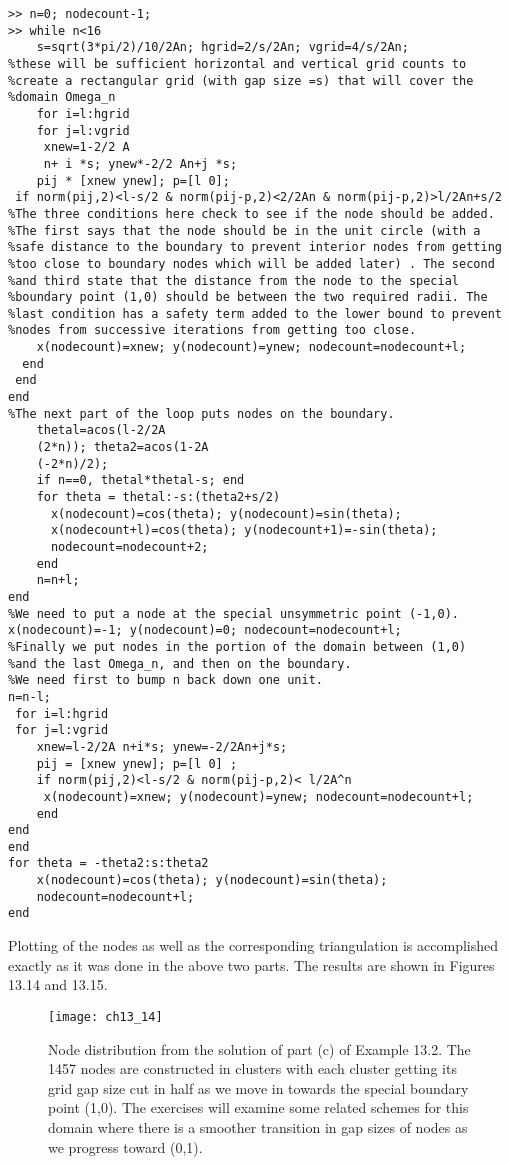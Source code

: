 \documentclass[../main.tex]{subfiles}
\begin{document}
\begin{lstlisting}[numbers=none,frame=none]
>> n=0; nodecount-1; 
>> while n<16 
	s=sqrt(3*pi/2)/10/2An; hgrid=2/s/2An; vgrid=4/s/2An; 
%these will be sufficient horizontal and vertical grid counts to 
%create a rectangular grid (with gap size =s) that will cover the 
%domain Omega_n 
	for i=l:hgrid 
	for j=l:vgrid 
	 xnew=1-2/2 A
	 n+ i *s; ynew*-2/2 An+j *s; 
	pij * [xnew ynew]; p=[l 0]; 
 if norm(pij,2)<l-s/2 & norm(pij-p,2)<2/2An & norm(pij-p,2)>l/2An+s/2 
%The three conditions here check to see if the node should be added. 
%The first says that the node should be in the unit circle (with a 
%safe distance to the boundary to prevent interior nodes from getting 
%too close to boundary nodes which will be added later) . The second
%and third state that the distance from the node to the special 
%boundary point (1,0) should be between the two required radii. The 
%last condition has a safety term added to the lower bound to prevent 
%nodes from successive iterations from getting too close. 
	x(nodecount)=xnew; y(nodecount)=ynew; nodecount=nodecount+l; 
  end 
 end 
end 
%The next part of the loop puts nodes on the boundary. 
	thetal=acos(l-2/2A
	(2*n)); theta2=acos(1-2A
	(-2*n)/2); 
	if n==0, thetal*thetal-s; end 
	for theta = thetal:-s:(theta2+s/2) 
  	  x(nodecount)=cos(theta); y(nodecount)=sin(theta); 
	  x(nodecount+l)=cos(theta); y(nodecount+1)=-sin(theta); 
	  nodecount=nodecount+2; 
	end 
	n=n+l; 
end 
%We need to put a node at the special unsymmetric point (-1,0). 
x(nodecount)=-1; y(nodecount)=0; nodecount=nodecount+l; 
%Finally we put nodes in the portion of the domain between (1,0) 
%and the last Omega_n, and then on the boundary. 
%We need first to bump n back down one unit. 
n=n-l; 
 for i=l:hgrid 
 for j=l:vgrid 
	xnew=l-2/2A	n+i*s; ynew=-2/2An+j*s; 
	pij = [xnew ynew]; p=[l 0] ; 
	if norm(pij,2)<l-s/2 & norm(pij-p,2)< l/2A^n 
	 x(nodecount)=xnew; y(nodecount)=ynew; nodecount=nodecount+l; 
	end 
end 
end 
for theta = -theta2:s:theta2 
	x(nodecount)=cos(theta); y(nodecount)=sin(theta); 
	nodecount=nodecount+l; 
end
\end{lstlisting}
Plotting of the nodes as well as the corresponding triangulation is accomplished exactly as it was done in the above two parts. The results are shown in Figures 13.14 and 13.15. 

\begin{figure}[H]
	\centering
	\texttt{[image: ch13\_14]}
	\caption{\textsf{  Node distribution from the solution of part (c) of Example 13.2. The 1457 nodes are constructed in clusters with each cluster getting its grid gap size cut in half as we move in towards the special boundary point (1,0). The exercises will examine some related schemes for this domain where there is a smoother transition in gap sizes of nodes as we progress toward (0,1).  }}
	\label{pfig:ch13_14}
\end{figure}
\end{document}
